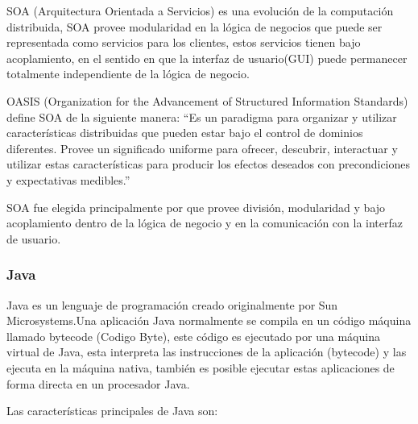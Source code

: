 SOA (Arquitectura Orientada a Servicios) es una evolución de la computación distribuida, SOA provee modularidad en la lógica de negocios que puede ser representada como servicios para los clientes, estos servicios tienen bajo acoplamiento, en el sentido en que la interfaz de usuario(GUI) puede permanecer totalmente independiente de la lógica de negocio.

OASIS (Organization for the Advancement of Structured Information Standards) define SOA de la siguiente manera: ``Es un paradigma para organizar y utilizar características distribuidas que pueden estar bajo el control de dominios diferentes. Provee un significado uniforme para ofrecer, descubrir, interactuar y utilizar estas características para producir los efectos deseados con precondiciones y expectativas medibles.'' \cite{oasis_soa}

SOA fue elegida principalmente por que provee división, modularidad y bajo acoplamiento dentro de la lógica de negocio y en la comunicación con la interfaz de usuario.


\subsubsection*{Java \cite{java} }
\label{tec:java}

Java es un lenguaje de programación creado originalmente por Sun Microsystems.\newline Una aplicación Java normalmente se compila en un código máquina llamado bytecode (Codigo Byte), este código es ejecutado por una máquina virtual de Java, esta interpreta las instrucciones de la aplicación (bytecode) y las ejecuta en la máquina nativa, también es posible ejecutar estas aplicaciones de forma directa en un procesador Java.

Las características principales de Java \cite{java_caracteristicas} son:

